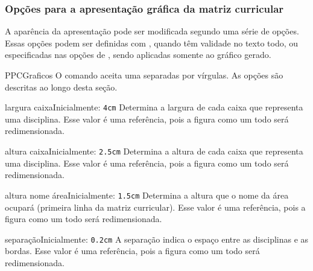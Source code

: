 \documentclass[a4paper, 11pt]{article}
\begin{document}
\begin{PDListing}
\end{PDListing}

\subsubsection*{Opções para a apresentação gráfica da matriz curricular}
A aparência da apresentação pode ser modificada segundo uma série de opções. Essas opções podem ser definidas com , quando têm validade no texto todo, ou especificadas nas opções de , sendo aplicadas somente ao gráfico gerado.

\begin{Macrodef}{PPCGraficos}{}{}
    O comando  aceita uma  separadas por vírgulas. As opções são descritas ao longo desta seção.
\end{Macrodef}

\begin{Optiondef}{largura caixa}{}{Inicialmente: \texttt{4cm}}
    Determina a largura de cada caixa que representa uma disciplina. Esse valor é uma referência, pois a figura como um todo será redimensionada.
\end{Optiondef}

\begin{Optiondef}{altura caixa}{}{Inicialmente: \texttt{2.5cm}}
    Determina a altura de cada caixa que representa uma disciplina. Esse valor é uma referência, pois a figura como um todo será redimensionada.
\end{Optiondef}

\begin{Optiondef}{altura nome área}{}{Inicialmente: \texttt{1.5cm}}
    Determina a altura que o nome da área ocupará (primeira linha da matriz curricular). Esse valor é uma referência, pois a figura como um todo será redimensionada.
\end{Optiondef}

\begin{Optiondef}{separação}{}{Inicialmente: \texttt{0.2cm}}
    A separação indica o espaço entre as disciplinas e as bordas. Esse valor é uma referência, pois a figura como um todo será redimensionada.
\end{Optiondef}
\end{document}
